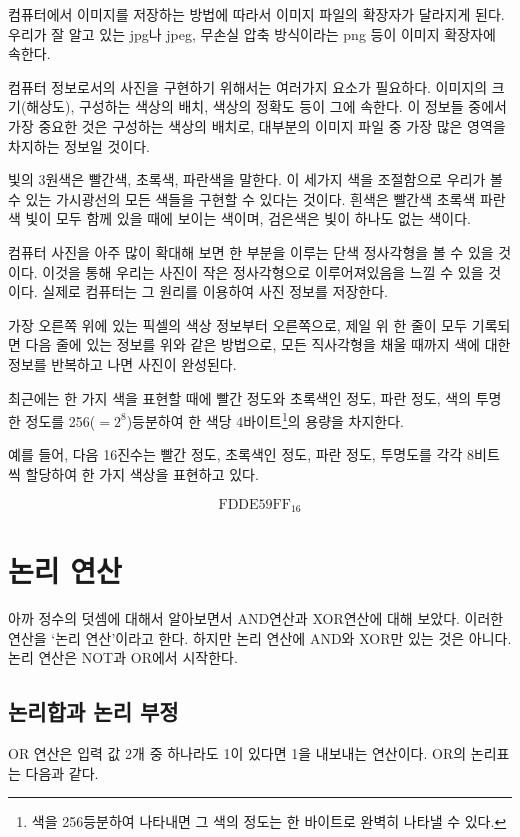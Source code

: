 \documentclass{article}
\begin{document}
컴퓨터에서 이미지를 저장하는 방법에 따라서 이미지 파일의 확장자가 달라지게 된다.
우리가 잘 알고 있는 jpg나 jpeg, 무손실 압축 방식이라는 png 등이 이미지 확장자에 속한다.

컴퓨터 정보로서의 사진을 구현하기 위해서는 여러가지 요소가 필요하다.
이미지의 크기(해상도), 구성하는 색상의 배치, 색상의 정확도 등이 그에 속한다.
이 정보들 중에서 가장 중요한 것은 구성하는 색상의 배치로,
대부분의 이미지 파일 중 가장 많은 영역을 차지하는 정보일 것이다.

빛의 3원색은 빨간색, 초록색, 파란색을 말한다. 이 세가지 색을 조절함으로 우리가 볼 수 있는
가시광선의 모든 색들을 구현할 수 있다는 것이다. 흰색은 빨간색 초록색 파란색 빛이 모두 함께 있을 때에
보이는 색이며, 검은색은 빛이 하나도 없는 색이다.

컴퓨터 사진을 아주 많이 확대해 보면 한 부분을 이루는 단색 정사각형을 볼 수 있을 것이다.
이것을 통해 우리는 사진이 작은 정사각형으로 이루어져있음을 느낄 수 있을 것이다.
실제로 컴퓨터는 그 원리를 이용하여 사진 정보를 저장한다.

가장 오른쪽 위에 있는 픽셀의 색상 정보부터 오른쪽으로,
제일 위 한 줄이 모두 기록되면 다음 줄에 있는 정보를 위와 같은 방법으로,
모든 직사각형을 채울 때까지 색에 대한 정보를 반복하고 나면 사진이 완성된다.

최근에는 한 가지 색을 표현할 때에 빨간 정도와 초록색인 정도, 파란 정도, 색의 투명한 정도를
256($=2^8$)등분하여 한 색당 4바이트\footnote{색을 256등분하여 나타내면 그 색의 정도는 한
바이트로 완벽히 나타낼 수 있다.}의 용량을 차지한다.

예를 들어, 다음 16진수는 빨간 정도, 초록색인 정도, 파란 정도, 투명도를 각각 8비트씩 할당하여
한 가지 색상을 표현하고 있다.

$$
\text{FDDE59FF}_{16}
$$

\section{논리 연산}

아까 정수의 덧셈에 대해서 알아보면서 AND연산과 XOR연산에 대해 보았다. 이러한 연산을 `논리
연산'이라고 한다. 하지만 논리 연산에 AND와 XOR만 있는 것은 아니다. 논리 연산은 NOT과 OR에서
시작한다.

\subsection{논리합과 논리 부정}

OR 연산은 입력 값 2개 중 하나라도 1이 있다면 1을 내보내는 연산이다. OR의 논리표는 다음과 같다.
\end{document}
